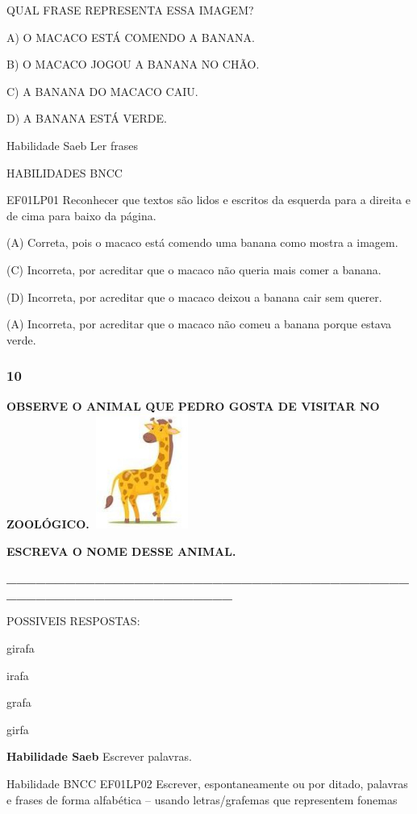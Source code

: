 QUAL FRASE REPRESENTA ESSA IMAGEM?

A) O MACACO ESTÁ COMENDO A BANANA.

B) O MACACO JOGOU A BANANA NO CHÃO.

C) A BANANA DO MACACO CAIU.

D) A BANANA ESTÁ VERDE.

Habilidade Saeb Ler frases

HABILIDADES BNCC

EF01LP01 Reconhecer que textos são lidos e escritos da esquerda para a
direita e de cima para baixo da página.

(A) Correta, pois o macaco está comendo uma banana como mostra a imagem.

(C) Incorreta, por acreditar que o macaco não queria mais comer a
banana.

(D) Incorreta, por acreditar que o macaco deixou a banana cair sem
querer.

(A) Incorreta, por acreditar que o macaco não comeu a banana porque
estava verde.

\subsubsection{10}\label{section-50}

\textbf{OBSERVE O ANIMAL QUE PEDRO GOSTA DE VISITAR NO
ZOOLÓGICO.}\includegraphics[width=1.36806in,height=1.47778in]{media/image219.jpg}

\textbf{ESCREVA O NOME DESSE ANIMAL.}

\textbf{\_\_\_\_\_\_\_\_\_\_\_\_\_\_\_\_\_\_\_\_\_\_\_\_\_\_\_\_\_\_\_\_\_\_\_\_\_\_\_\_\_\_\_\_\_\_\_\_\_\_\_\_\_\_\_\_\_\_\_\_\_\_\_\_}

POSSIVEIS RESPOSTAS:

girafa

irafa

grafa

girfa

\textbf{Habilidade Saeb} Escrever palavras.

Habilidade BNCC EF01LP02 Escrever, espontaneamente ou por ditado,
palavras e frases de forma alfabética -- usando letras/grafemas que
representem fonemas

